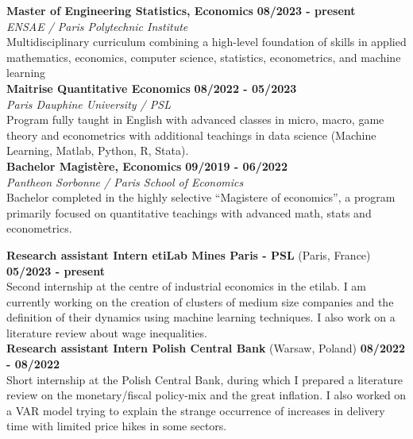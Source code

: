 \documentclass[11pt]{report}
\begin{document}
	
\noindent\textbf{Master of Engineering \textbar\space Statistics,  Economics}
\hfill
\textbf{08/2023 - present} \\
\emph{ENSAE / Paris Polytechnic Institute}\\
Multidisciplinary curriculum combining a high-level foundation of skills in applied mathematics, economics, computer science, statistics, econometrics, and machine learning\\

\noindent\textbf{Maitrise \textbar\space Quantitative Economics}
\hfill
\textbf{08/2022 - 05/2023} \\
\emph{Paris Dauphine University / PSL}\\
Program fully taught in English with advanced classes in micro, macro, game theory and econometrics  with additional teachings in data science (Machine Learning, Matlab, Python, R, Stata).\\

\noindent\textbf{Bachelor \textbar\space Magistère, Economics}
\hfill
\textbf{09/2019 - 06/2022} \\
\emph{Pantheon Sorbonne / Paris School of Economics}\\
Bachelor completed in the highly selective “Magistere of economics”, a program primarily focused on quantitative teachings with advanced math, stats and econometrics.


	\begin{flushleft}
	 \hrulefill
	\end{flushleft}


\noindent\textbf{Research assistant Intern \textbar\space etiLab Mines Paris - PSL} (Paris, France)
\hfill
\textbf{05/2023 - present} \\
Second internship at the centre of industrial economics in the etilab. I am currently working on the creation of clusters of medium size companies and the definition of their dynamics using machine learning techniques. I also work on a literature review about wage inequalities. \\

\noindent\textbf{Research assistant Intern \textbar\space Polish Central Bank} (Warsaw, Poland)
\hfill
\textbf{08/2022 - 08/2022} \\
Short internship at the Polish Central Bank, during which I prepared a literature review on the monetary/fiscal policy-mix and the great inflation. I also worked on a VAR model trying to explain the strange occurrence of increases in delivery time with limited price hikes in some sectors.  \\
\end{document}
